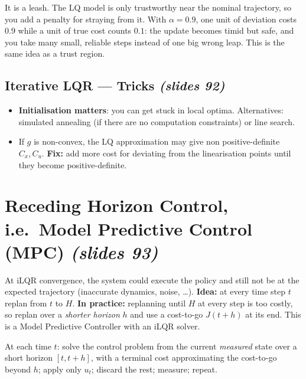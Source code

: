 \documentclass[11pt,a4paper]{article}
\newcommand{\slides}[1]{\emph{(slides #1)}}
\theoremstyle{plain}
\theoremstyle{definition}
\theoremstyle{remark}
\begin{document}
\begin{intuition}
It is a leash. The LQ model is only trustworthy near the nominal trajectory, so you add a penalty for straying from it. With $\alpha=0.9$, one unit of deviation costs $0.9$ while a unit of true cost counts $0.1$: the update becomes timid but safe, and you take many small, reliable steps instead of one big wrong leap. This is the same idea as a trust region.
\end{intuition}

\subsection{Iterative LQR --- Tricks \slides{92}}

\begin{itemize}[nosep]
  \item \textbf{Initialisation matters}: you can get stuck in local optima. Alternatives: simulated annealing (if there are no computation constraints) or line search.
  \item If $g$ is non-convex, the LQ approximation may give non positive-definite $C_x,C_u$. \textbf{Fix:} add more cost for deviating from the linearisation points until they become positive-definite.
\end{itemize}

\section{Receding Horizon Control, i.e.\ Model Predictive Control (MPC) \slides{93}}

At iLQR convergence, the system could execute the policy and still not be at the expected trajectory (inaccurate dynamics, noise, \dots). \textbf{Idea:} at every time step $t$ replan from $t$ to $H$. \textbf{In practice:} replanning until $H$ at every step is too costly, so replan over a \emph{shorter horizon} $h$ and use a cost-to-go $J(t+h)$ at its end. This is a Model Predictive Controller with an iLQR solver.

\begin{algorithm}\label{alg:mpc}
At each time $t$: solve the control problem from the current \emph{measured} state over a short horizon $[t,t+h]$, with a terminal cost approximating the cost-to-go beyond $h$; apply only $u_t$; discard the rest; measure; repeat.
\end{algorithm}
\end{document}
